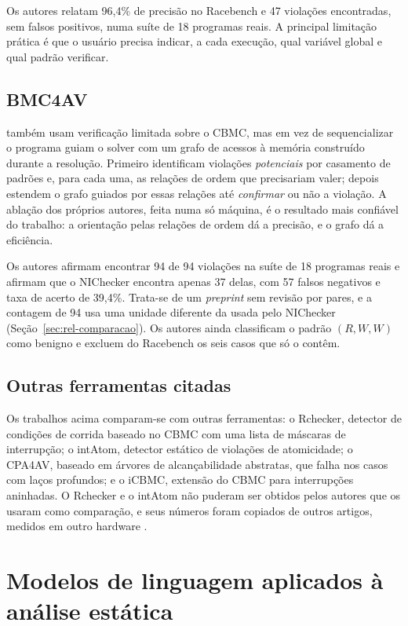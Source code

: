 Os autores relatam 96,4\% de precisão no Racebench e 47 violações encontradas,
sem falsos positivos, numa suíte de 18 programas reais. A principal limitação
prática é que o usuário precisa indicar, a cada execução, qual variável global
e qual padrão verificar.

\subsection{BMC4AV}

 também usam verificação limitada sobre o CBMC, mas em vez
de sequencializar o programa guiam o solver com um grafo de acessos à memória
construído durante a resolução. Primeiro identificam violações
\textit{potenciais} por casamento de padrões e, para cada uma, as relações de
ordem que precisariam valer; depois estendem o grafo guiados por essas relações
até \textit{confirmar} ou não a violação. A ablação dos próprios autores, feita
numa só máquina, é o resultado mais confiável do trabalho: a orientação pelas
relações de ordem dá a precisão, e o grafo dá a eficiência.

Os autores afirmam encontrar 94 de 94 violações na suíte de 18 programas reais
e afirmam que o NIChecker encontra apenas 37 delas, com 57 falsos negativos e taxa de acerto de 39,4\%.
Trata-se de um \textit{preprint} sem revisão por pares, e a contagem de
94 usa uma unidade diferente da usada pelo NIChecker
(Seção~\ref{sec:rel-comparacao}). Os autores ainda classificam o padrão
$(R,W,W)$ como benigno e excluem do Racebench os seis casos que só o contêm.

\subsection{Outras ferramentas citadas}

Os trabalhos acima comparam-se com outras ferramentas: o Rchecker, detector de
condições de corrida baseado no CBMC com uma lista de máscaras de interrupção;
o intAtom, detector estático de violações de atomicidade; o CPA4AV, baseado em
árvores de alcançabilidade abstratas, que falha nos casos com laços profundos;
e o iCBMC, extensão do CBMC para interrupções aninhadas. O Rchecker e o intAtom não puderam ser obtidos pelos autores que os usaram como comparação, e seus números foram copiados de outros artigos, medidos em outro hardware \cite{intrace,nichecker,bmc4av}.

\section{Modelos de linguagem aplicados à análise estática}
\label{sec:rel-llm}


